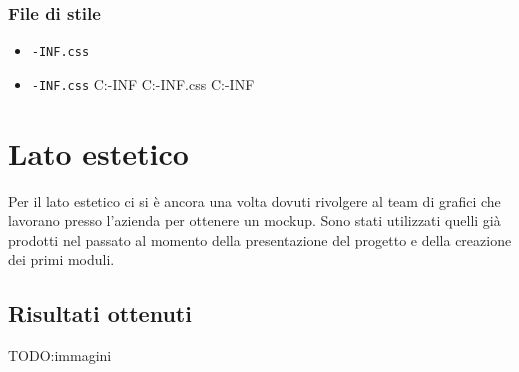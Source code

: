 \subsubsection{File di stile}
\begin{itemize}
\item \texttt{\themes\theme\src\main\resources\META-INF\resources\themes\CoralTreeTheme\dashboard\footer\footer.css}
\item \texttt{\themes\theme\src\main\resources\META-INF\resources\themes\CoralTreeTheme\dashboard\header\header.css}
C:\themes\theme\src\main\resources\META-INF\resources\themes\CoralTreeTheme\images
C:\themes\theme\src\main\resources\META-INF\resources\themes\CoralTreeTheme\presentation.css
C:\themes\theme\src\main\resources\META-INF\resources\themes\CoralTreeTheme\yui\assets
\end{itemize}
\section{Lato estetico}
Per il lato estetico ci si è ancora una volta dovuti rivolgere al team di grafici che lavorano presso l'azienda per ottenere un mockup. Sono stati utilizzati quelli già prodotti nel passato al momento della presentazione del progetto e della creazione dei primi moduli.
\subsection{Risultati ottenuti}
TODO:immagini